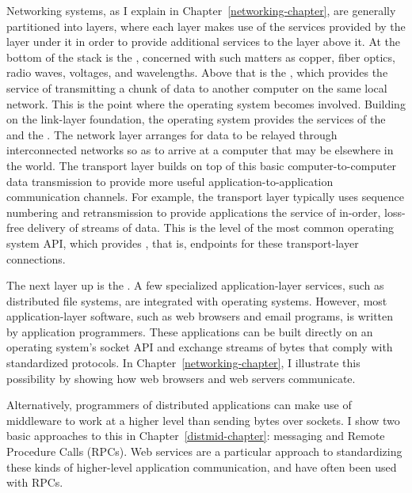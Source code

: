 Networking systems, as I explain in Chapter~\ref{networking-chapter},
are generally partitioned into layers, where each layer makes use of
the services provided by the layer under it in order to provide
additional services to the layer above it.  At the bottom of the stack
is the , concerned with such matters as copper,
fiber optics, radio waves, voltages, and wavelengths.  Above that is
the , which provides the service of transmitting a
chunk of data to another computer on the same local network.  This is
the point where the operating system becomes involved.  Building on
the link-layer foundation, the operating system provides the services
of the  and the .  The network
layer arranges for data to be relayed through interconnected networks
so as to arrive at a computer that may be elsewhere in the world.  The
transport layer builds on top of this basic computer-to-computer data
transmission to provide more useful application-to-application
communication channels.  For example, the transport layer typically
uses sequence numbering and retransmission to provide applications the
service of in-order, loss-free delivery of streams of data.  This is
the level of the most common operating system API, which provides
, that is, endpoints for these transport-layer
connections.

The next layer up is the .  A few specialized
application-layer services, such as distributed file systems, are
integrated with operating systems.  However, most application-layer
software, such as web browsers and email programs, is written by
application programmers.  These applications can be built directly on
an operating system's socket API and exchange streams of bytes that
comply with standardized protocols.  In
Chapter~\ref{networking-chapter}, I illustrate this possibility by
showing how web browsers and web servers communicate.

Alternatively, programmers of distributed applications can make use of
middleware to work at a higher level than sending bytes over sockets.
I show two basic approaches to this in Chapter~\ref{distmid-chapter}:
messaging and Remote Procedure Calls (RPCs).  Web services are a particular
approach to standardizing these kinds of higher-level application
communication, and have often been used with RPCs.

